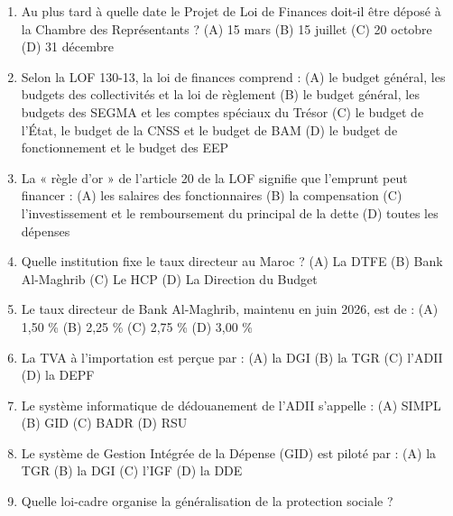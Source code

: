 \begin{enumerate}[leftmargin=*, label=\textbf{Q\arabic*.}]
    \item Au plus tard à quelle date le Projet de Loi de Finances doit-il être déposé à la Chambre des Représentants ?
    \newline (A) 15 mars \quad (B) 15 juillet \quad (C) 20 octobre \quad (D) 31 décembre
    \item Selon la LOF 130-13, la loi de finances comprend :
    \newline (A) le budget général, les budgets des collectivités et la loi de règlement
    \newline (B) le budget général, les budgets des SEGMA et les comptes spéciaux du Trésor
    \newline (C) le budget de l'État, le budget de la CNSS et le budget de BAM
    \newline (D) le budget de fonctionnement et le budget des EEP
    \item La « règle d'or » de l'article 20 de la LOF signifie que l'emprunt peut financer :
    \newline (A) les salaires des fonctionnaires \quad (B) la compensation
    \newline (C) l'investissement et le remboursement du principal de la dette \quad (D) toutes les dépenses
    \item Quelle institution fixe le taux directeur au Maroc ?
    \newline (A) La DTFE \quad (B) Bank Al-Maghrib \quad (C) Le HCP \quad (D) La Direction du Budget
    \item Le taux directeur de Bank Al-Maghrib, maintenu en juin 2026, est de :
    \newline (A) 1,50 \% \quad (B) 2,25 \% \quad (C) 2,75 \% \quad (D) 3,00 \%
    \item La TVA à l'importation est perçue par :
    \newline (A) la DGI \quad (B) la TGR \quad (C) l'ADII \quad (D) la DEPF
    \item Le système informatique de dédouanement de l'ADII s'appelle :
    \newline (A) SIMPL \quad (B) GID \quad (C) BADR \quad (D) RSU
    \item Le système de Gestion Intégrée de la Dépense (GID) est piloté par :
    \newline (A) la TGR \quad (B) la DGI \quad (C) l'IGF \quad (D) la DDE
    \item Quelle loi-cadre organise la généralisation de la protection sociale ?

\end{enumerate}
